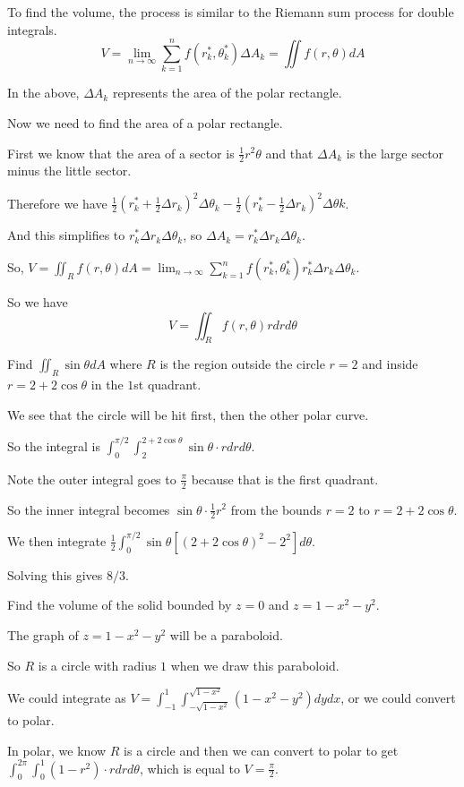 \documentclass[../calc3.tex]{subfiles}
\begin{document}
To find the volume, the process is similar to the Riemann sum process for double integrals.
\[ V = \lim_{n\to\infty}\sum_{k=1}^n f(r_k^*, \theta_k^*)\Delta A_k = \iint f(r,\theta)dA \]

In the above, $\Delta A_k$ represents the area of the polar rectangle. 

Now we need to find the area of a polar rectangle.

First we know that the area of a sector is $\frac{1}{2}r^2\theta$ and that $\Delta A_k$ is the large sector minus the little sector.

Therefore we have $\frac{1}{2}\left(r_k^*+\frac{1}{2}\Delta r_k\right)^2\Delta \theta_k - \frac{1}{2}\left(r_k^* - \frac{1}{2}\Delta r_k\right)^2\Delta \theta k$.

And this simplifies to $r_k^* \Delta r_k \Delta \theta_k$, so $\Delta A_k = r_k^*\Delta r_k\Delta \theta_k$.

So, $V=\iint_R f(r,\theta)dA=\lim_{n\to\infty}\sum_{k=1}^n f(r_k^*, \theta_k^*)r_k^* \Delta r_k\Delta \theta_k$.

So we have 
\[ V = \iint_R f(r,\theta)rdrd\theta\]

\begin{example}
    Find $\iint_R \sin\theta dA$ where $R$ is the region outside the circle $r=2$ and inside $r=2+2\cos\theta$ in the $1$st quadrant.

    We see that the circle will be hit first, then the other polar curve.

    So the integral is $\int_0^{\pi/2}\int_2^{2+2\cos\theta}\sin\theta\cdot rdrd\theta$.

    Note the outer integral goes to $\frac{\pi}{2}$ because that is the first quadrant.

    So the inner integral becomes $\sin\theta \cdot \frac{1}{2}r^2$ from the bounds $r=2$ to $r=2+2\cos\theta$.

    We then integrate $\frac{1}{2}\int_0^{\pi/2}\sin\theta [(2+2\cos\theta)^2-2^2]d\theta$.

    Solving this gives $8/3$.
\end{example}

\begin{example}
    Find the volume of the solid bounded by $z=0$ and $z=1-x^2-y^2$.

    The graph of $z=1-x^2-y^2$ will be a paraboloid.

    So $R$ is a circle with radius $1$ when we draw this paraboloid.

    We could integrate as $V=\int_{-1}^1 \int_{-\sqrt{1-x^2}}^{\sqrt{1-x^2}}(1-x^2-y^2)dydx$, or we could convert to polar.

    In polar, we know $R$ is a circle and then we can convert to polar to get $\int_0^{2\pi}\int_0^1 (1-r^2)\cdot r drd\theta$, which is equal to $V=\frac{\pi}{2}$.
\end{example}
\end{document}
